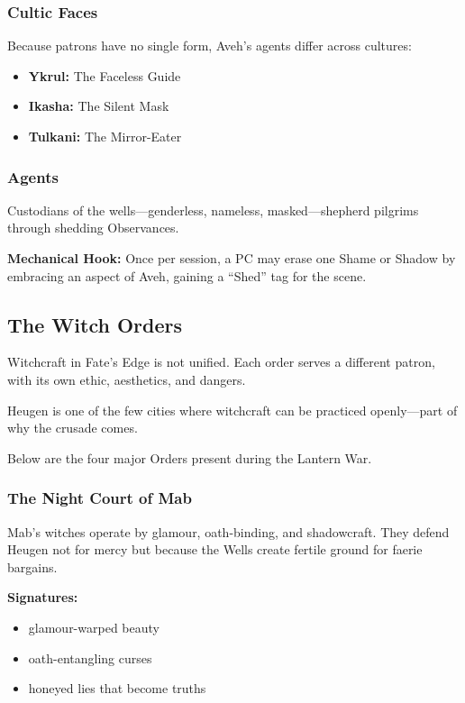 \documentclass[11pt]{book}
\begin{document}
\subsubsection*{Cultic Faces}
Because patrons have no single form, Aveh's agents differ across cultures:
\begin{itemize}
    \item \textbf{Ykrul:} The Faceless Guide  
    \item \textbf{Ikasha:} The Silent Mask  
    \item \textbf{Tulkani:} The Mirror-Eater  
\end{itemize}

\subsubsection*{Agents}
Custodians of the wells---genderless, nameless, masked---shepherd pilgrims through shedding Observances.

\textbf{Mechanical Hook:}  
Once per session, a PC may erase one Shame or Shadow by embracing an aspect of Aveh, gaining a ``Shed'' tag for the scene.

\subsection{The Witch Orders}

Witchcraft in Fate's Edge is not unified. Each order serves a different patron, with its own  
ethic, aesthetics, and dangers.

Heugen is one of the few cities where witchcraft can be practiced openly---part of why the crusade comes.

Below are the four major Orders present during the Lantern War.

\subsubsection{The Night Court of Mab}

Mab's witches operate by glamour, oath-binding, and shadowcraft. They defend Heugen not for mercy  
but because the Wells create fertile ground for faerie bargains.

\textbf{Signatures:}
\begin{itemize}[leftmargin=*]
    \item glamour-warped beauty  
    \item oath-entangling curses  
    \item honeyed lies that become truths  
\end{itemize}
\end{document}
